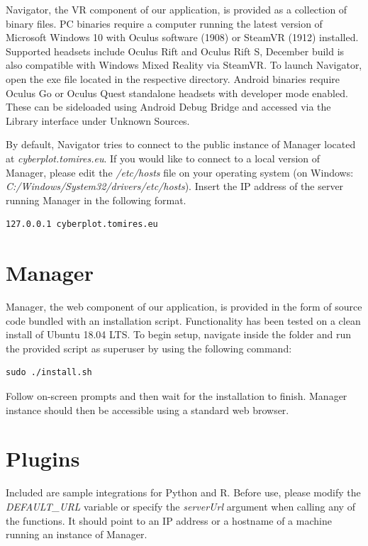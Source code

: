 \documentclass[thesis=M,english,hidelinks]{FITthesisXE}[2012/06/26]
\begin{document}
Navigator, the VR component of our application, is provided as a collection of binary files. PC binaries require a computer running the latest version of Microsoft Windows 10 with Oculus software (1908) or SteamVR (1912) installed. Supported headsets include Oculus Rift and Oculus Rift S, December build is also compatible with Windows Mixed Reality via SteamVR. To launch Navigator, open the exe file located in the respective directory. Android binaries require Oculus Go or Oculus Quest standalone headsets with developer mode enabled.\autocite{godevmode} These can be sideloaded using Android Debug Bridge and accessed via the Library interface under Unknown Sources.

\newpage

By default, Navigator tries to connect to the public instance of Manager located at \emph{cyberplot.tomires.eu}. If you would like to connect to a local version of Manager, please edit the \emph{/etc/hosts} file on your operating system (on Windows: \emph{C:/Windows/System32/drivers/etc/hosts}). Insert the IP address of the server running Manager in the following format.

\begin{lstlisting}
127.0.0.1 cyberplot.tomires.eu
\end{lstlisting}

\section{Manager}

Manager, the web component of our application, is provided in the form of source code bundled with an installation script. Functionality has been tested on a clean install of Ubuntu 18.04 LTS. To begin setup, navigate inside the folder and run the provided script as superuser by using the following command:

\begin{lstlisting}
sudo ./install.sh
\end{lstlisting}

Follow on-screen prompts and then wait for the installation to finish. Manager instance should then be accessible using a standard web browser.

\section{Plugins}

Included are sample integrations for Python and R. Before use, please modify the \emph{DEFAULT\_URL} variable or specify the \emph{serverUrl} argument when calling any of the functions. It should point to an IP address or a hostname of a machine running an instance of Manager.
\end{document}

